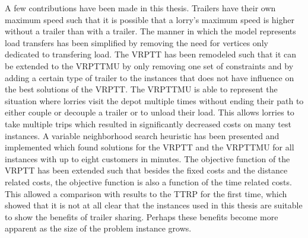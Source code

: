 %
A few contributions have been made in this thesis.
Trailers have their own maximum speed such that it is possible that a lorry's maximum speed is higher without a trailer than with a trailer.
The manner in which the model represents load transfers has been simplified by removing the need for vertices only dedicated to transfering load.
The VRPTT has been remodeled such that it can be extended to the VRPTTMU by only removing one set of constraints and by adding a certain type of trailer to the instances that does not have   influence on the best solutions of the VRPTT.
The VRPTTMU is able to represent the situation where lorries visit the depot multiple times without ending their path to either couple or decouple a trailer or to unload their load.
This allows lorries to take multiple trips which resulted in significantly decreased costs on many test instances.
A variable neighborhood search heuristic has been presented and implemented which found solutions for the VRPTT and the VRPTTMU  for all instances with up to eight customers in minutes.
The objective function of the VRPTT has been extended such that besides the fixed costs and the distance related costs, the  objective function is also a function of the time related costs.
This allowed a comparison with results to the TTRP for the first time, which showed that it is not at all clear that the instances used in this thesis are suitable to show the benefits of trailer sharing.
Perhaps these benefits become more apparent as the size of the problem instance grows.
\\



